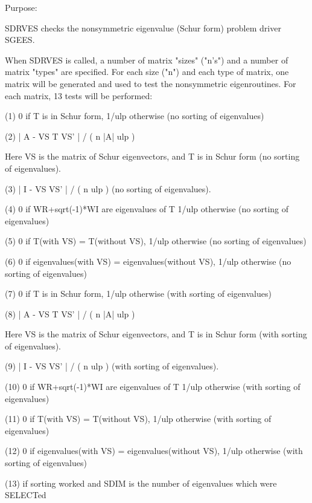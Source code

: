 \begin{DoxyParagraph}{Purpose\+: }
\begin{DoxyVerb}    SDRVES checks the nonsymmetric eigenvalue (Schur form) problem
    driver SGEES.

    When SDRVES is called, a number of matrix "sizes" ("n's") and a
    number of matrix "types" are specified.  For each size ("n")
    and each type of matrix, one matrix will be generated and used
    to test the nonsymmetric eigenroutines.  For each matrix, 13
    tests will be performed:

    (1)     0 if T is in Schur form, 1/ulp otherwise
           (no sorting of eigenvalues)

    (2)     | A - VS T VS' | / ( n |A| ulp )

      Here VS is the matrix of Schur eigenvectors, and T is in Schur
      form  (no sorting of eigenvalues).

    (3)     | I - VS VS' | / ( n ulp ) (no sorting of eigenvalues).

    (4)     0     if WR+sqrt(-1)*WI are eigenvalues of T
            1/ulp otherwise
            (no sorting of eigenvalues)

    (5)     0     if T(with VS) = T(without VS),
            1/ulp otherwise
            (no sorting of eigenvalues)

    (6)     0     if eigenvalues(with VS) = eigenvalues(without VS),
            1/ulp otherwise
            (no sorting of eigenvalues)

    (7)     0 if T is in Schur form, 1/ulp otherwise
            (with sorting of eigenvalues)

    (8)     | A - VS T VS' | / ( n |A| ulp )

      Here VS is the matrix of Schur eigenvectors, and T is in Schur
      form  (with sorting of eigenvalues).

    (9)     | I - VS VS' | / ( n ulp ) (with sorting of eigenvalues).

    (10)    0     if WR+sqrt(-1)*WI are eigenvalues of T
            1/ulp otherwise
            (with sorting of eigenvalues)

    (11)    0     if T(with VS) = T(without VS),
            1/ulp otherwise
            (with sorting of eigenvalues)

    (12)    0     if eigenvalues(with VS) = eigenvalues(without VS),
            1/ulp otherwise
            (with sorting of eigenvalues)

    (13)    if sorting worked and SDIM is the number of
            eigenvalues which were SELECTed


\end{DoxyVerb}
\end{DoxyParagraph}
